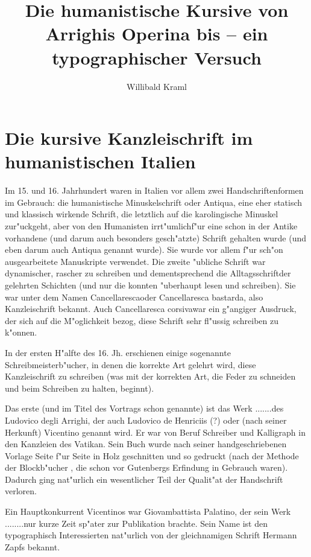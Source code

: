 \documentclass[draft,12pt,a4paper,german]{article}
\title{Die humanistische Kursive von Arrighis Operina bis \MF{} -- ein
typographischer Versuch}
\author{Willibald Kraml}
\begin{document}
\maketitle

\section{Die kursive Kanzleischrift im humanistischen Italien}

Im 15. und 16. Jahrhundert waren in Italien vor allem zwei
Handschriftenformen im Gebrauch: die humanistische Minuskelschrift oder
Antiqua, eine eher statisch und klassisch wirkende Schrift, die letztlich
auf die karolingische Minuskel zur"uckgeht, aber von den Humanisten
\glqq irrt"umlich\grqq  f"ur eine schon in der Antike vorhandene (und darum auch
besonders gesch"atzte) Schrift gehalten wurde (und eben darum auch 
\glqq Antiqua\grqq 
genannt wurde). Sie wurde vor allem f"ur sch"on ausgearbeitete Manuskripte
verwendet.  Die zweite "ubliche Schrift war dynamischer, rascher zu schreiben
und dementsprechend die \glqq Alltagsschrift\grqq  der gelehrten Schichten 
(und nur
die konnten "uberhaupt lesen und schreiben).  Sie war unter dem Namen
\glqq Cancellaresca\grqq  oder \glqq Cancellaresca bastarda\grqq , also 
\glqq Kanzleischrift\grqq 
bekannt. Auch \glqq Cancellaresca corsiva\grqq  war ein g"angiger Ausdruck,
der sich
auf die M"oglichkeit bezog, diese Schrift sehr fl"ussig schreiben zu k"onnen.

In der ersten H"alfte des 16. Jh. erschienen einige sogenannte
\glqq Schreibmeisterb"ucher\grqq , in denen die korrekte Art gelehrt wird, diese
Kanzleischrift zu schreiben (was mit der korrekten Art, die Feder zu
schneiden und beim Schreiben zu halten, beginnt).

Das erste (und im Titel des Vortrags schon genannte) ist das Werk
\glqq .......\grqq  des Ludovico degli Arrighi, der auch Ludovico de Henriciis
(?) oder
(nach seiner Herkunft) Vicentino genannt wird.
Er war von Beruf Schreiber und Kalligraph in den Kanzleien des Vatikan.
Sein Buch wurde nach seiner handgeschriebenen Vorlage Seite f"ur Seite in
Holz geschnitten und so gedruckt (nach der Methode der \glqq Blockb"ucher\grqq
, die
schon vor Gutenbergs Erfindung in Gebrauch waren). Dadurch ging nat"urlich
ein wesentlicher Teil der Qualit"at der Handschrift verloren.

Ein Hauptkonkurrent Vicentinos war Giovambattista Palatino, der sein Werk
\glqq ........\grqq  nur kurze Zeit sp"ater zur Publikation brachte. Sein Name
ist den
typographisch Interessierten nat"urlich von der gleichnamigen Schrift Hermann
Zapfs bekannt.
\end{document}
